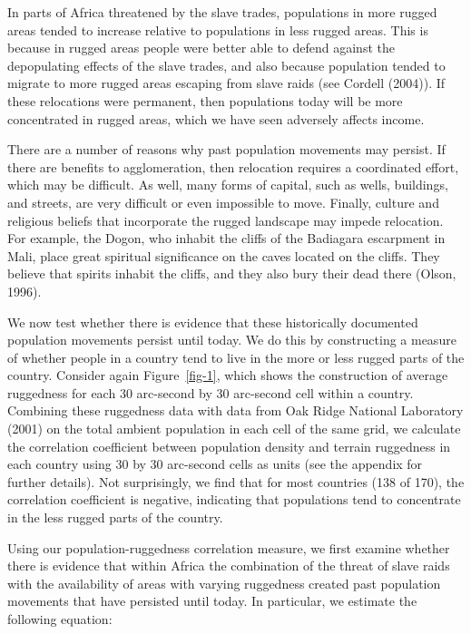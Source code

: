 \documentclass[
  letterpaper,
  DIV=11,
  numbers=noendperiod]{scrartcl}
\begin{document}
In parts of Africa threatened by the slave trades, populations in more
rugged areas tended to increase relative to populations in less rugged
areas. This is because in rugged areas people were better able to defend
against the depopulating effects of the slave trades, and also because
population tended to migrate to more rugged areas escaping from slave
raids (see Cordell (2004)). If these relocations were permanent, then
populations today will be more concentrated in rugged areas, which we
have seen adversely affects income.

There are a number of reasons why past population movements may persist.
If there are benefits to agglomeration, then relocation requires a
coordinated effort, which may be difficult. As well, many forms of
capital, such as wells, buildings, and streets, are very difficult or
even impossible to move. Finally, culture and religious beliefs that
incorporate the rugged landscape may impede relocation. For example, the
Dogon, who inhabit the cliffs of the Badiagara escarpment in Mali, place
great spiritual significance on the caves located on the cliffs. They
believe that spirits inhabit the cliffs, and they also bury their dead
there (Olson, 1996).

We now test whether there is evidence that these historically documented
population movements persist until today. We do this by constructing a
measure of whether people in a country tend to live in the more or less
rugged parts of the country. Consider again Figure~\ref{fig-1}, which
shows the construction of average ruggedness for each 30 arc-second by
30 arc-second cell within a country. Combining these ruggedness data
with data from Oak Ridge National Laboratory (2001) on the total ambient
population in each cell of the same grid, we calculate the correlation
coefficient between population density and terrain ruggedness in each
country using 30 by 30 arc-second cells as units (see the appendix for
further details). Not surprisingly, we find that for most countries (138
of 170), the correlation coefficient is negative, indicating that
populations tend to concentrate in the less rugged parts of the country.

Using our population-ruggedness correlation measure, we first examine
whether there is evidence that within Africa the combination of the
threat of slave raids with the availability of areas with varying
ruggedness created past population movements that have persisted until
today. In particular, we estimate the following equation:
\end{document}
